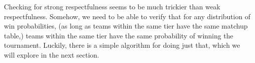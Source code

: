 {    Checking for strong respectfulness seems to be much trickier than weak respectfulness. Somehow, we need to be able to verify that for any distribution of win probabilities, (as long as teams within the same tier have the same matchup table,) teams within the same tier have the same probability of winning the tournament. Luckily, there is a simple algorithm for doing just that, which we will explore in the next section.
}








    


